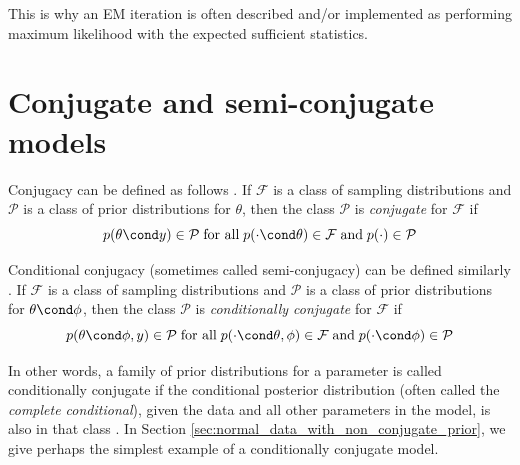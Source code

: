 \documentclass{article} %
\begin{document}
This is why an EM iteration is often described and/or implemented as performing maximum likelihood with the expected sufficient statistics.


 
 \section{Conjugate and semi-conjugate models} \label{sec:conjugate_exponential_family_models}
 
Conjugacy can be defined as follows \cite{gelman2013bayesian}. If $\mathcal{F}$ is a class of sampling distributions and $\mathcal{P}$ is a class of prior distributions for $\theta$, then the class $\mathcal{P}$ is \textit{conjugate} for $\mathcal{F}$ if
\[  p(\theta \cond y ) \in \mathcal{P} \; \text{for all} \; p(\cdot \cond \theta) \in \mathcal{F} \; \text{and} \; p(\cdot) \in \mathcal{P} \]

Conditional conjugacy (sometimes called semi-conjugacy) can be defined similarly  \cite{gelman2013bayesian}.  If $\mathcal{F}$ is a class of sampling distributions and $\mathcal{P}$ is a class of prior distributions for $\theta \cond \phi$, then the class $\mathcal{P}$ is \textit{conditionally conjugate} for $\mathcal{F}$ if
\[  p(\theta \cond \phi, y) \in \mathcal{P} \; \text{for all} \; p(\cdot \cond \theta, \phi) \in \mathcal{F} \; \text{and} \; p(\cdot \cond \phi) \in \mathcal{P} \]

\begin{remark}{}
In other words,  a family of prior distributions for a parameter is called conditionally conjugate if the conditional posterior distribution (often called the \textit{complete conditional}),  given the data and all other parameters in the model,  is also in that class  \cite{gelman2006prior}.     In Section \ref{sec:normal_data_with_non_conjugate_prior}, we give perhaps the simplest example of a conditionally conjugate model.
 
\end{remark}
 
\end{document}
